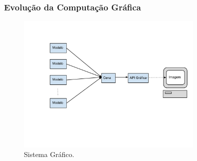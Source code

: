 \documentclass{beamer}
\begin{document}


\begin{frame}
\frametitle{Evolução da Computação Gráfica}

	\begin{figure}[!h]
		\begin{center}
			\includegraphics[width=0.8\textwidth]{Figures/ModelagemCG}
			\caption{Sistema Gráfico.}
		\end{center}
		
	\end{figure}

\end{frame}

\end{document}
